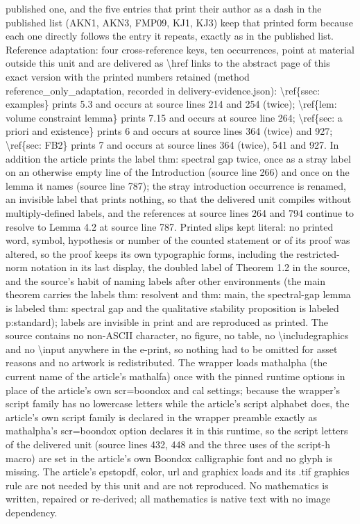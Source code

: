 \documentclass[10pt,a4paper]{amsart}
\numberwithin{equation}{section}
\begin{document}
published one, and the five entries that print their author as a dash in the published list (AKN1, AKN3, FMP09, KJ1, KJ3) keep that printed form because each one directly follows the entry it repeats, exactly as in the published list. Reference adaptation: four cross-reference keys, ten occurrences, point at material outside this unit and are delivered as \textbackslash{}href links to the abstract page of this exact version with the printed numbers retained (method reference\_only\_adaptation, recorded in delivery-evidence.json): \textbackslash{}ref\{ssec: examples\} prints 5.3 and occurs at source lines 214 and 254 (twice); \textbackslash{}ref\{lem: volume constraint lemma\} prints 7.15 and occurs at source line 264; \textbackslash{}ref\{sec: a priori and existence\} prints 6 and occurs at source lines 364 (twice) and 927; \textbackslash{}ref\{sec: FB2\} prints 7 and occurs at source lines 364 (twice), 541 and 927. In addition the article prints the label thm: spectral gap twice, once as a stray label on an otherwise empty line of the Introduction (source line 266) and once on the lemma it names (source line 787); the stray introduction occurrence is renamed, an invisible label that prints nothing, so that the delivered unit compiles without multiply-defined labels, and the references at source lines 264 and 794 continue to resolve to Lemma 4.2 at source line 787. Printed slips kept literal: no printed word, symbol, hypothesis or number of the counted statement or of its proof was altered, so the proof keeps its own typographic forms, including the restricted-norm notation in its last display, the doubled label of Theorem 1.2 in the source, and the source's habit of naming labels after other environments (the main theorem carries the labels thm: resolvent and thm: main, the spectral-gap lemma is labeled thm: spectral gap and the qualitative stability proposition is labeled p:standard); labels are invisible in print and are reproduced as printed. The source contains no non-ASCII character, no figure, no table, no \textbackslash{}includegraphics and no \textbackslash{}input anywhere in the e-print, so nothing had to be omitted for asset reasons and no artwork is redistributed. The wrapper loads mathalpha (the current name of the article's mathalfa) once with the pinned runtime options in place of the article's own scr=boondox and cal settings; because the wrapper's script family has no lowercase letters while the article's script alphabet does, the article's own script family is declared in the wrapper preamble exactly as mathalpha's scr=boondox option declares it in this runtime, so the script letters of the delivered unit (source lines 432, 448 and the three uses of the script-h macro) are set in the article's own Boondox calligraphic font and no glyph is missing. The article's epstopdf, color, url and graphicx loads and its .tif graphics rule are not needed by this unit and are not reproduced. No mathematics is written, repaired or re-derived; all mathematics is native text with no image dependency.
\end{document}
